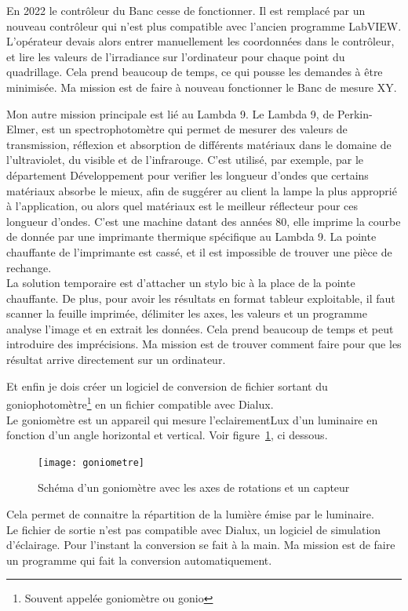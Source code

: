 \documentclass[12pt]{article}
\begin{document}
En 2022 le contrôleur du Banc cesse de fonctionner.
Il est remplacé par un nouveau contrôleur qui n'est plus compatible avec l'ancien programme LabVIEW.\\
L'opérateur devais alors entrer manuellement les coordonnées dans le contrôleur, et lire les valeurs de l'irradiance sur l'ordinateur pour chaque point du quadrillage.
Cela prend beaucoup de temps, ce qui pousse les demandes à être minimisée.
Ma mission est de faire à nouveau fonctionner le Banc de mesure XY.


Mon autre mission principale est lié au Lambda 9.
Le Lambda 9, de Perkin-Elmer, est un spectrophotomètre qui permet de mesurer des valeurs de transmission, réflexion et absorption de différents matériaux dans le domaine de l'ultraviolet, du visible et de l'infrarouge.
C'est utilisé, par exemple, par le département Développement pour verifier les longueur d'ondes que certains matériaux absorbe le mieux, afin de suggérer au client la lampe la plus approprié à l'application, ou alors quel matériaux est le meilleur réflecteur pour ces longueur d'ondes.
C'est une machine datant des années 80, elle imprime la courbe de donnée par une imprimante thermique spécifique au Lambda 9.
La pointe chauffante de l'imprimante est cassé, et il est impossible de trouver une pièce de rechange.\\
La solution temporaire est d'attacher un stylo bic à la place de la pointe chauffante.
De plus, pour avoir les résultats en format tableur exploitable, il faut scanner la feuille imprimée, délimiter les axes, les valeurs et un programme analyse l'image et en extrait les données.
Cela prend beaucoup de temps et peut introduire des imprécisions.
Ma mission est de trouver comment faire pour que les résultat arrive directement sur un ordinateur.



Et enfin je dois créer un logiciel de conversion de fichier sortant du goniophotomètre\footnote{Souvent appelée goniomètre ou gonio} en un fichier compatible avec Dialux.\\
Le goniomètre est un appareil qui mesure l'\gls{eclairementLux} d'un luminaire en fonction d'un angle horizontal et vertical.
Voir figure~\ref{fig:gonio}, ci dessous.
\begin{figure}[h]
	\centering
	\texttt{[image: goniometre]}
	\caption{Schéma d'un goniomètre avec les axes de rotations et un capteur}
	\label{fig:gonio}
\end{figure}
Cela permet de connaitre la répartition de la lumière émise par le luminaire.\\
Le fichier de sortie n'est pas compatible avec Dialux, un logiciel de simulation d'éclairage.
Pour l'instant la conversion se fait à la main. 
Ma mission est de faire un programme qui fait la conversion automatiquement.
\newpage
\end{document}
